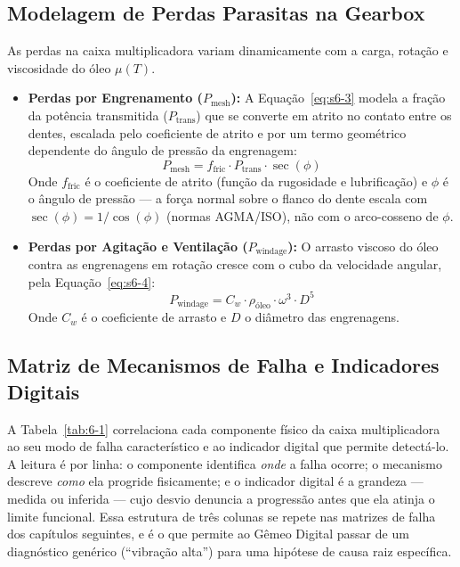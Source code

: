 \documentclass[12pt,a4paper]{article}
\numberwithin{equation}{section}
\numberwithin{table}{section}
\numberwithin{figure}{section}
\begin{document}
{	\subsection{\textbf{Modelagem de Perdas Parasitas na Gearbox}}
	As perdas na caixa multiplicadora variam dinamicamente com a carga, rotação e viscosidade do óleo $\mu(T)$.
	\begin{itemize}
		\item \textbf{Perdas por Engrenamento ($P_{\text{mesh}}$):} A Equação~\eqref{eq:s6-3} modela a fração da potência transmitida ($P_{\text{trans}}$) que se converte em atrito no contato entre os dentes, escalada pelo coeficiente de atrito e por um termo geométrico dependente do ângulo de pressão da engrenagem:
		\begin{equation}\label{eq:s6-3}
 P_{\text{mesh}} = f_{\text{fric}} \cdot P_{\text{trans}} \cdot \sec(\phi)
\end{equation}
		Onde $f_{\text{fric}}$ é o coeficiente de atrito (função da rugosidade e lubrificação) e $\phi$ é o ângulo de pressão — a força normal sobre o flanco do dente escala com $\sec(\phi) = 1/\cos(\phi)$ (normas AGMA/ISO), não com o arco-cosseno de $\phi$.
		\item \textbf{Perdas por Agitação e Ventilação ($P_{\text{windage}}$):} O arrasto viscoso do óleo contra as engrenagens em rotação cresce com o cubo da velocidade angular, pela Equação~\eqref{eq:s6-4}:
		\begin{equation}\label{eq:s6-4}
 P_{\text{windage}} = C_w \cdot \rho_{\text{óleo}} \cdot \omega^3 \cdot D^5 
\end{equation}
		Onde $C_w$ é o coeficiente de arrasto e $D$ o diâmetro das engrenagens.
	\end{itemize}
	
	\subsection{\textbf{Matriz de Mecanismos de Falha e Indicadores Digitais}}
	A Tabela~\ref{tab:6-1} correlaciona cada componente físico da caixa multiplicadora ao seu modo de falha característico e ao indicador digital que permite detectá-lo. A leitura é por linha: o componente identifica \textit{onde} a falha ocorre; o mecanismo descreve \textit{como} ela progride fisicamente; e o indicador digital é a grandeza — medida ou inferida — cujo desvio denuncia a progressão antes que ela atinja o limite funcional. Essa estrutura de três colunas se repete nas matrizes de falha dos capítulos seguintes, e é o que permite ao Gêmeo Digital passar de um diagnóstico genérico (``vibração alta'') para uma hipótese de causa raiz específica.
	
}
\end{document}
